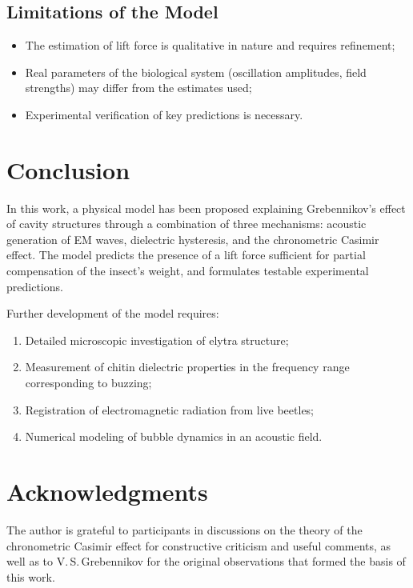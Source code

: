 \documentclass[12pt,a4paper]{article}
\begin{document}
\subsection{Limitations of the Model}

\begin{itemize}
    \item The estimation of lift force is qualitative in nature and requires refinement;
    \item Real parameters of the biological system (oscillation amplitudes, field strengths) may differ from the estimates used;
    \item Experimental verification of key predictions is necessary.
\end{itemize}

\section{Conclusion}

In this work, a physical model has been proposed explaining Grebennikov's effect of cavity structures through a combination of three mechanisms: acoustic generation of EM waves, dielectric hysteresis, and the chronometric Casimir effect. The model predicts the presence of a lift force sufficient for partial compensation of the insect's weight, and formulates testable experimental predictions.

Further development of the model requires:
\begin{enumerate}
    \item Detailed microscopic investigation of elytra structure;
    \item Measurement of chitin dielectric properties in the frequency range corresponding to buzzing;
    \item Registration of electromagnetic radiation from live beetles;
    \item Numerical modeling of bubble dynamics in an acoustic field.
\end{enumerate}

\section*{Acknowledgments}

The author is grateful to participants in discussions on the theory of the chronometric Casimir effect for constructive criticism and useful comments, as well as to V.\,S.\,Grebennikov for the original observations that formed the basis of this work.
\end{document}
